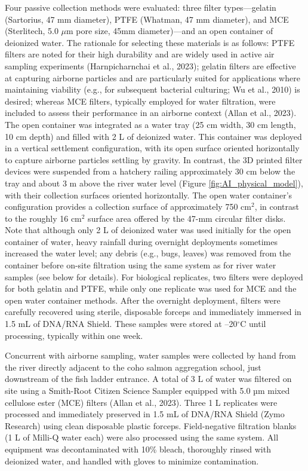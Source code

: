 \documentclass{article}
\begin{document}
Four passive collection methods were evaluated: three filter types—gelatin (Sartorius, 47 mm diameter), PTFE (Whatman, 47 mm diameter), and MCE (Sterlitech, 5.0 $\mu$m pore size, 45mm diameter)—and an open container of deionized water. The rationale for selecting these materials is as follows: PTFE filters are noted for their high durability and are widely used in active air sampling experiments (Harnpicharnchai et al., 2023); gelatin filters are effective at capturing airborne particles and are particularly suited for applications where maintaining viability (e.g., for subsequent bacterial culturing; Wu et al., 2010) is desired; whereas MCE filters, typically employed for water filtration, were included to assess their performance in an airborne context (Allan et al., 2023). The open container was integrated as a water tray (25 cm width, 30 cm length, 10 cm depth) and filled with 2 L of deionized water. This container was deployed in a vertical settlement configuration, with its open surface oriented horizontally to capture airborne particles settling by gravity. In contrast, the 3D printed filter devices were suspended from a hatchery railing approximately 30 cm below the tray and about 3 m above the river water level (Figure \ref{fig:AI_physical_model}), with their collection surfaces oriented horizontally. The open water container’s configuration provides a collection surface of approximately 750 cm$^2$, in contrast to the roughly 16 cm$^2$ surface area offered by the 47-mm circular filter disks. Note that although only 2 L of deionized water was used initially for the open container of water, heavy rainfall during overnight deployments sometimes increased the water level; any debris (e.g., bugs, leaves) was removed from the container before on-site filtration using the same system as for river water samples (see below for details). For biological replicates, two filters were deployed for both gelatin and PTFE, while only one replicate was used for MCE and the open water container methods. After the overnight deployment, filters were carefully recovered using sterile, disposable forceps and immediately immersed in 1.5 mL of DNA/RNA Shield. These samples were stored at –20$^\circ$C until processing, typically within one week.

Concurrent with airborne sampling, water samples were collected by hand from the river directly adjacent to the coho salmon aggregation school, just downstream of the fish ladder entrance. A total of 3 L of water was filtered on site using a Smith-Root Citizen Science Sampler equipped with 5.0 µm mixed cellulose ester (MCE) filters (Allan et al., 2023). Three 1 L replicates were processed and immediately preserved in 1.5 mL of DNA/RNA Shield (Zymo Research) using clean disposable plastic forceps. Field-negative filtration blanks (1 L of Milli-Q water each) were also processed using the same system. All equipment was decontaminated with 10\% bleach, thoroughly rinsed with deionized water, and handled with gloves to minimize contamination.
\end{document}
